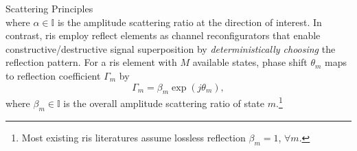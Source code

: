 \documentclass[journal]{IEEEtran}
\begin{document}
\begin{section}{Scattering Principles}
\begin{equation}
		\label{eq:backscatter_modulation}
	\end{equation}
	where $\alpha \in \mathbb{I}$ is the amplitude scattering ratio at the direction of interest.
	In contrast, \gls{ris} employ reflect elements as channel reconfigurators that enable constructive/destructive signal superposition by \emph{deterministically choosing} the reflection pattern.
	For a \gls{ris} element with $M$ available states, phase shift $\theta_m$ maps to reflection coefficient $\Gamma_m$ by \cite{Wu2018}
	\begin{equation}
		\Gamma_m = \beta_m \exp(j \theta_m),
		\label{eq:passive_beamforming}
	\end{equation}
	where $\beta_m \in \mathbb{I}$ is the overall amplitude scattering ratio of state $m$.\footnote{Most existing \gls{ris} literatures assume lossless reflection $\beta_m=1$, $\forall m$.}
\end{section}
\end{document}
